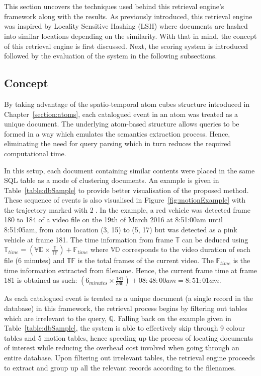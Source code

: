 \section{\versionOneRet}
\label{section:versionOne}
This section uncovers the techniques used behind this retrieval engine's
framework along with the results. As previously introduced, this retrieval
engine was inspired by Locality Sensitive Hashing (LSH) where documents are
hashed into similar locations depending on the similarity. With that in mind,
the concept of this retrieval engine is first discussed. Next, the scoring
system is introduced followed by the evaluation of the system in the
following subsections.

\subsection{Concept}
\label{versionOneConcept}
By taking advantage of the spatio-temporal atom cubes structure introduced in
Chapter~\ref{section:atoms}, each catalogued event in an atom was treated as a
unique document. The underlying atom-based structure allows queries to be
formed in a way which emulates the semantics extraction process. Hence,
eliminating the need for query parsing which in turn reduces the required
computational time.

In this setup, each document containing similar contents were placed in the
same SQL table as a mode of clustering documents. An example is given in
Table~\ref{table:dbSample} to provide better visualisation of the proposed
method. These sequence of events is also visualised in
Figure~\ref{fig:motionExample} with the trajectory marked with \textcircled{2}.
In the example, a red vehicle was detected frame 180 to 184 of a video file on
the 19th of March 2016 at 8:51:00am until 8:51:05am, from atom location (3, 15)
to (5, 17) but was detected as a pink vehicle at frame 181.
The time information from frame $\mathbb{T}$ can be deduced using
$\mathbb{T}_{time}  = (\mathbb{VD} \times \frac{\mathbb{T}}{\mathbb{TF}}) + \mathbb{F}_{time}$
where $\mathbb{VD}$ corresponds to the video duration of each file (6 minutes)
and $\mathbb{TF}$ is the total frames of the current video. The
$\mathbb{F}_{time}$ is the time information extracted from filename. Hence, the
current frame time at frame 181 is obtained as such:
$(6_{minutes} \times \frac{181}{360}) + 08:48:00am = 8:51:01am$.

As each catalogued event is treated as a unique document (a single record in
the database) in this framework, the retrieval process begins by filtering out
tables which are irrelevant to the query, $\mathbb{Q}$. Falling back on the
example given in Table~\ref{table:dbSample}, the system is able to effectively
skip through 9 colour tables and 5 motion tables, hence speeding up the process
of locating documents of interest while reducing the overhead cost involved
when going through an entire database. Upon filtering out irrelevant tables,
the retrieval engine proceeds to extract and group up all the relevant records
according to the filenames.

